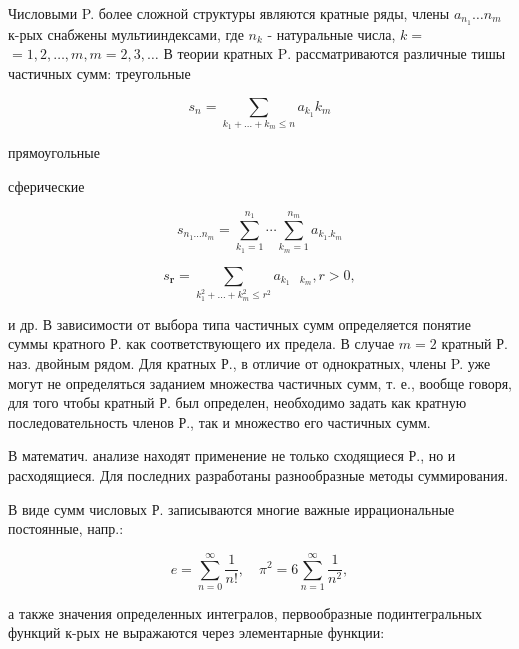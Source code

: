 \documentclass[10pt]{article}
\begin{document}
Числовыми P. более сложной структуры являются кратные ряды, члены $a_{n_{1}} \ldots n_{m}$ к-рых снабжены мультииндексами, где $n_{k}$ - натуральные числа, $k=$ $=1,2, \ldots, m, m=2,3, \ldots$ В теории кратных $\mathrm{P}$. рассматриваются различные тишы частичных сумм: треугольные



\[

s_{n}=\sum_{k_{1}+\ldots+k_{m} \leqslant n} a_{k_{1}} k_{m}

\]



прямоугольные



сферические



\[

s_{n_{1} \ldots n_{m}}=\sum_{k_{1}=1}^{n_{1}} \cdots \sum_{k_{m}=1}^{n_{m}} a_{k_{1} . k_{m}}

\]



\[

s_{\boldsymbol{r}}=\sum_{k_{1}^{2}+\ldots+k_{m}^{2} \leqslant r^{2}} a_{k_{1} \quad k_{m}}, r>0,

\]



и др. В зависимости от выбора типа частичных сумм определяется понятие суммы кратного Р. как соответствующего их предела. В случае $m=2$ кратный Р. наз. двойным рядом. Для кратных Р., в отличие от однократных, члены P. уже могут не определяться заданием множества частичных сумм, т. е., вообще говоря, для того чтобы кратный Р. был определен, необходимо задать как кратную последовательность членов Р., так и множество его частичных сумм.



В математич. анализе находят применение не только сходящиеся Р., но и расходящиеся. Для последних разработаны разнообразные методы суммирования.



В виде сумм числовых Р. записываются многие важные иррациональные постоянные, напр.:



\[

e=\sum_{n=0}^{\infty} \frac{1}{n !}, \quad \pi^{2}=6 \sum_{n=1}^{\infty} \frac{1}{n^{2}},

\]



а также значения определенных интегралов, первообразные подинтегральных функций к-рых не выражаются через элементарные функции:
\end{document}
